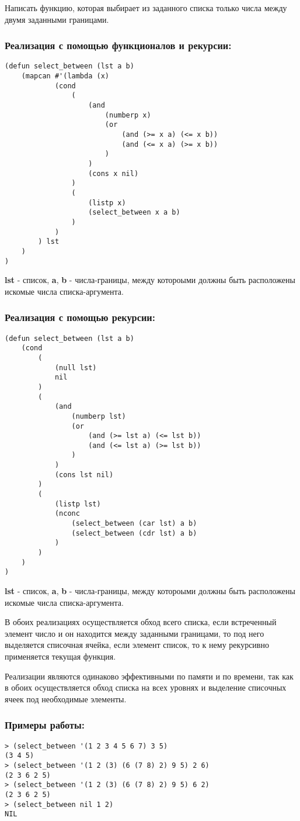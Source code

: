 \documentclass[a4paper,12pt]{article}
\begin{document}
Написать функцию, которая выбирает из заданного списка только числа между двумя заданными границами.

\subsubsection*{Реализация с помощью функционалов и рекурсии:}
\begin{lstlisting}[caption=Функция выбора чисел между указанными границами]
(defun select_between (lst a b)
	(mapcan	#'(lambda (x)
			(cond	
				(
					(and
						(numberp x) 
						(or 
							(and (>= x a) (<= x b)) 
							(and (<= x a) (>= x b))
						)
					)
					(cons x nil)
				)
				(
					(listp x) 
					(select_between x a b)
				)
			)
		) lst
	)
)
\end{lstlisting}
\textbf{lst} - список, \textbf{a}, \textbf{b} - числа-границы, между котороыми должны быть расположены искомые числа списка-аргумента.

\subsubsection*{Реализация с помощью рекурсии:}
\begin{lstlisting}[caption=Функция выбора чисел между указанными границами]
(defun select_between (lst a b)
	(cond 
		(
			(null lst)
			nil
		)
		(
			(and 
				(numberp lst)
				(or 
					(and (>= lst a) (<= lst b)) 
					(and (<= lst a) (>= lst b))
				)
			)
			(cons lst nil)
		)
		(
			(listp lst)
			(nconc 
				(select_between (car lst) a b)
				(select_between (cdr lst) a b)
			)
		)
	)
)
\end{lstlisting}
\textbf{lst} - список, \textbf{a}, \textbf{b} - числа-границы, между котороыми должны быть расположены искомые числа списка-аргумента.

В обоих реализациях осуществляется обход всего списка, если встреченный элемент число и он находится между заданными границами, то под него выделяется списочная ячейка, если элемент список, то к нему рекурсивно применяется текущая функция.

Реализации являются одинаково эффективными по памяти и по времени, так как в обоих осуществляется обход списка на всех уровнях и выделение списочных ячеек под необходимые элементы.

\subsubsection*{Примеры работы:}
\begin{lstlisting}
> (select_between '(1 2 3 4 5 6 7) 3 5)
(3 4 5)
> (select_between '(1 2 (3) (6 (7 8) 2) 9 5) 2 6)
(2 3 6 2 5)
> (select_between '(1 2 (3) (6 (7 8) 2) 9 5) 6 2)
(2 3 6 2 5)
> (select_between nil 1 2)
NIL
\end{lstlisting}
\end{document}
